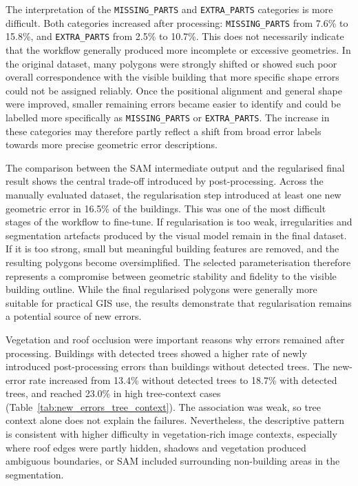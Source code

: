 The interpretation of the \texttt{MISSING\_PARTS} and \texttt{EXTRA\_PARTS} categories is more difficult. Both categories increased after processing: \texttt{MISSING\_PARTS} from 7.6\% to 15.8\%, and \texttt{EXTRA\_PARTS} from 2.5\% to 10.7\%. This does not necessarily indicate that the workflow generally produced more incomplete or excessive geometries. In the original dataset, many polygons were strongly shifted or showed such poor overall correspondence with the visible building that more specific shape errors could not be assigned reliably. Once the positional alignment and general shape were improved, smaller remaining errors became easier to identify and could be labelled more specifically as \texttt{MISSING\_PARTS} or \texttt{EXTRA\_PARTS}. The increase in these categories may therefore partly reflect a shift from broad error labels towards more precise geometric error descriptions.

The comparison between the SAM intermediate output and the regularised final result shows the central trade-off introduced by post-processing. Across the manually evaluated dataset, the regularisation step introduced at least one new geometric error in 16.5\% of the buildings. This was one of the most difficult stages of the workflow to fine-tune. If regularisation is too weak, irregularities and segmentation artefacts produced by the visual model remain in the final dataset. If it is too strong, small but meaningful building features are removed, and the resulting polygons become oversimplified. The selected parameterisation therefore represents a compromise between geometric stability and fidelity to the visible building outline. While the final regularised polygons were generally more suitable for practical GIS use, the results demonstrate that regularisation remains a potential source of new errors.

Vegetation and roof occlusion were important reasons why errors remained after processing. Buildings with detected trees showed a higher rate of newly introduced post-processing errors than buildings without detected trees. The new-error rate increased from 13.4\% without detected trees to 18.7\% with detected trees, and reached 23.0\% in high tree-context cases (Table~\ref{tab:new_errors_tree_context}). The association was weak, so tree context alone does not explain the failures. Nevertheless, the descriptive pattern is consistent with higher difficulty in vegetation-rich image contexts, especially where roof edges were partly hidden, shadows and vegetation produced ambiguous boundaries, or SAM included surrounding non-building areas in the segmentation.

